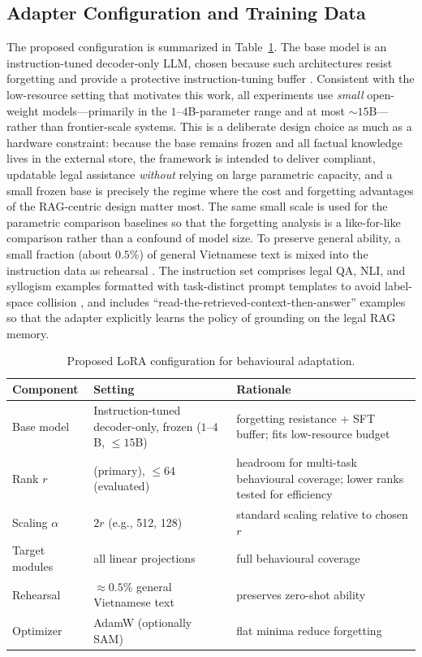 \subsection{Adapter Configuration and Training Data}
The proposed configuration is summarized in Table~\ref{tab:lora_config}. The base model is an instruction-tuned decoder-only LLM, chosen because such architectures resist forgetting and provide a protective instruction-tuning buffer \parencite{li2024revisitingcatastrophicforgettinglarge}. Consistent with the low-resource setting that motivates this work, all experiments use \emph{small} open-weight models---primarily in the $1$--$4$B-parameter range and at most ${\sim}15$B---rather than frontier-scale systems. This is a deliberate design choice as much as a hardware constraint: because the base remains frozen and all factual knowledge lives in the external store, the framework is intended to deliver compliant, updatable legal assistance \emph{without} relying on large parametric capacity, and a small frozen base is precisely the regime where the cost and forgetting advantages of the RAG-centric design matter most. The same small scale is used for the parametric comparison baselines so that the forgetting analysis is a like-for-like comparison rather than a confound of model size. To preserve general ability, a small fraction (about $0.5\%$) of general Vietnamese text is mixed into the instruction data as rehearsal \parencite{scialom-etal-2022-fine}. The instruction set comprises legal QA, NLI, and syllogism examples formatted with task-distinct prompt templates to avoid label-space collision \parencite{yin-etal-2022-contintin}, and includes ``read-the-retrieved-context-then-answer'' examples so that the adapter explicitly learns the policy of grounding on the legal RAG memory.

\begin{table}[H]
\centering
\small
\caption{Proposed LoRA configuration for behavioural adaptation.}
\label{tab:lora_config}
\begin{tabularx}{\textwidth}{l >{\raggedright\arraybackslash}X >{\raggedright\arraybackslash}X}
\hline
\textbf{Component} & \textbf{Setting} & \textbf{Rationale} \\
\hline
Base model & Instruction-tuned decoder-only, frozen ($1$--$4$B, ${\le}15$B) & forgetting resistance + SFT buffer; fits low-resource budget \\
Rank $r$ & 256 (primary), $\le 64$ (evaluated) & headroom for multi-task behavioural coverage; lower ranks tested for efficiency \\
Scaling $\alpha$ & $2r$ (e.g., 512, 128) & standard scaling relative to chosen $r$ \\
Target modules & all linear projections & full behavioural coverage \\
Rehearsal & $\approx 0.5\%$ general Vietnamese text & preserves zero-shot ability \\
Optimizer & AdamW (optionally SAM) & flat minima reduce forgetting \\
\hline
\end{tabularx}
\end{table}

